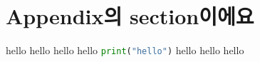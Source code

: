 \documentclass[../note.tex]{subfiles}
\begin{document}
\section{Appendix의 section이에요}
hello hello hello hello \lstinline[language=Python]{print("hello")} hello hello hello


\end{document}
